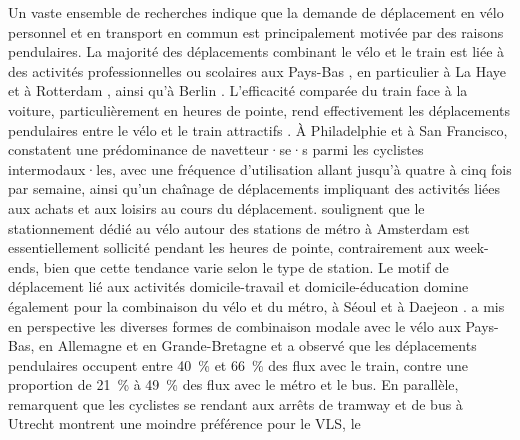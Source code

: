 \begin{refsegment}
Un vaste ensemble de recherches indique que la demande de déplacement en vélo personnel et en transport en commun est principalement motivée par des raisons pendulaires. La majorité des déplacements combinant le vélo et le train est liée à des activités professionnelles ou scolaires aux Pays-Bas \textcolor{blue}{\autocite[15]{shelat_analysing_2018}}, en particulier à La Haye et à Rotterdam \textcolor{blue}{\autocites[16]{la_paix_puello_train_2016}[8]{jonkeren_bicycle_2021}}, ainsi qu'à Berlin \textcolor{blue}{\autocite[78]{oostendorp_combining_2018}}. L'efficacité comparée du train face à la voiture, particulièrement en heures de pointe, rend effectivement les déplacements pendulaires entre le vélo et le train attractifs \textcolor{blue}{\autocite[63]{papon_rapport_2015}}. À Philadelphie et à San Francisco, \textcolor{blue}{\textcite[104]{flamm_public_2014}} constatent une prédominance de navetteur·se·s parmi les cyclistes intermodaux·les, avec une fréquence d'utilisation allant jusqu'à quatre à cinq fois par semaine, ainsi qu'un chaînage de déplacements impliquant des activités liées aux achats et aux loisirs au cours du déplacement. \textcolor{blue}{\textcite[344]{kampen_bicycle_2021}} soulignent que le stationnement dédié au vélo autour des stations de métro à Amsterdam est essentiellement sollicité pendant les heures de pointe, contrairement aux week-ends, bien que cette tendance varie selon le type de station. Le motif de déplacement lié aux activités domicile-travail et domicile-éducation domine également pour la combinaison du vélo et du métro, à Séoul et à Daejeon \textcolor{blue}{\autocite[46]{lee_strategies_2010}}. \textcolor{blue}{\textcite[288]{martens_bicycle_2004}} a mis en perspective les diverses formes de combinaison modale avec le vélo aux Pays-Bas, en Allemagne et en Grande-Bretagne et a observé que les déplacements pendulaires occupent entre 40~\% et 66~\% des flux avec le train, contre une proportion de 21~\% à 49~\% des flux avec le métro et le bus. En parallèle, \textcolor{blue}{\textcite[291]{kuijk_preferences_2022}} remarquent que les cyclistes se rendant aux arrêts de tramway et de bus à Utrecht montrent une moindre préférence pour le \acrshort{VLS}, le 
\end{refsegment}

